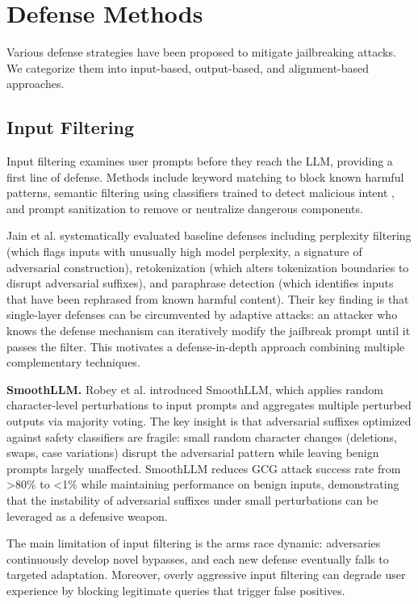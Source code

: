 \documentclass[conference]{IEEEtran}
\begin{document}
\section{Defense Methods}

Various defense strategies have been proposed to mitigate jailbreaking attacks. We categorize them into input-based, output-based, and alignment-based approaches.

\subsection{Input Filtering}

Input filtering examines user prompts before they reach the LLM, providing a first line of defense. Methods include keyword matching to block known harmful patterns, semantic filtering using classifiers trained to detect malicious intent \cite{jain2023baseline}, and prompt sanitization to remove or neutralize dangerous components.

Jain et al. \cite{jain2023baseline} systematically evaluated baseline defenses including perplexity filtering (which flags inputs with unusually high model perplexity, a signature of adversarial construction), retokenization (which alters tokenization boundaries to disrupt adversarial suffixes), and paraphrase detection (which identifies inputs that have been rephrased from known harmful content). Their key finding is that single-layer defenses can be circumvented by adaptive attacks: an attacker who knows the defense mechanism can iteratively modify the jailbreak prompt until it passes the filter. This motivates a defense-in-depth approach combining multiple complementary techniques.

\textbf{SmoothLLM.} Robey et al. \cite{robey2023smoothllm} introduced SmoothLLM, which applies random character-level perturbations to input prompts and aggregates multiple perturbed outputs via majority voting. The key insight is that adversarial suffixes optimized against safety classifiers are fragile: small random character changes (deletions, swaps, case variations) disrupt the adversarial pattern while leaving benign prompts largely unaffected. SmoothLLM reduces GCG attack success rate from >80\% to <1\% while maintaining performance on benign inputs, demonstrating that the instability of adversarial suffixes under small perturbations can be leveraged as a defensive weapon.

The main limitation of input filtering is the arms race dynamic: adversaries continuously develop novel bypasses, and each new defense eventually falls to targeted adaptation. Moreover, overly aggressive input filtering can degrade user experience by blocking legitimate queries that trigger false positives.
\end{document}
